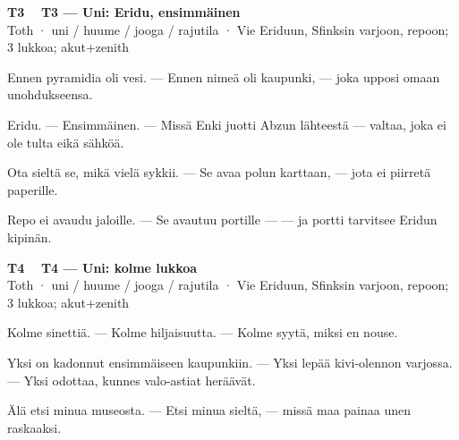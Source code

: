 \documentclass[a4paper,11pt]{article}
\begin{document}
\filbreak
\vspace{0.9mm}
\noindent
\begin{tcolorbox}[
  colframe=tothcol,
  colback=white,
  boxrule=0.8pt,
  arc=0pt,
  outer arc=0pt,
  left=2.5mm, right=2.5mm, top=2mm, bottom=2mm,
  boxsep=0.5mm,
  sharp corners,
  enhanced,
  breakable=false
]
{\large\ttfamily\bfseries T3}~~
{\normalsize\bfseries T3 --- Uni: Eridu, ensimmäinen}\\[0.2em]
{\small\color{black!65} Toth · uni / huume / jooga / rajutila · Vie Eriduun, Sfinksin varjoon, repoon; 3 lukkoa; akut+zenith}\\[0.35em]
{\normalsize\raggedright Ennen pyramidia oli vesi. --- Ennen nimeä oli kaupunki, --- joka upposi omaan unohdukseensa.

Eridu. --- Ensimmäinen. --- Missä Enki juotti Abzun lähteestä --- valtaa, joka ei ole tulta eikä sähköä.

Ota sieltä se, mikä vielä sykkii. --- Se avaa polun karttaan, --- jota ei piirretä paperille.

Repo ei avaudu jaloille. --- Se avautuu portille --- --- ja portti tarvitsee Eridun kipinän.}
\end{tcolorbox}

\filbreak
\vspace{0.9mm}
\noindent
\begin{tcolorbox}[
  colframe=tothcol,
  colback=white,
  boxrule=0.8pt,
  arc=0pt,
  outer arc=0pt,
  left=2.5mm, right=2.5mm, top=2mm, bottom=2mm,
  boxsep=0.5mm,
  sharp corners,
  enhanced,
  breakable=false
]
{\large\ttfamily\bfseries T4}~~
{\normalsize\bfseries T4 --- Uni: kolme lukkoa}\\[0.2em]
{\small\color{black!65} Toth · uni / huume / jooga / rajutila · Vie Eriduun, Sfinksin varjoon, repoon; 3 lukkoa; akut+zenith}\\[0.35em]
{\normalsize\raggedright Kolme sinettiä. --- Kolme hiljaisuutta. --- Kolme syytä, miksi en nouse.

Yksi on kadonnut ensimmäiseen kaupunkiin. --- Yksi lepää kivi-olennon varjossa. --- Yksi odottaa, kunnes valo-astiat heräävät.

Älä etsi minua museosta. --- Etsi minua sieltä, --- missä maa painaa unen raskaaksi.}
\end{tcolorbox}
\end{document}

